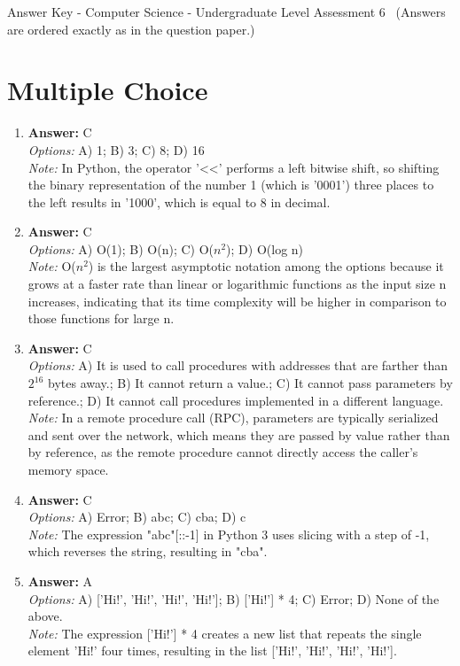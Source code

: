 \documentclass[12pt]{article}
\begin{document}
\begin{center}
Answer Key - Computer Science - Undergraduate Level Assessment 6 \
\small (Answers are ordered exactly as in the question paper.)
\end{center}

\section*{Multiple Choice}
\begin{enumerate}[label=\arabic*.]
\item \textbf{Answer:} C
\\ \textit{Options:} A) 1; B) 3; C) 8; D) 16
\\ \textit{Note:} In Python, the operator '\textless{}\textless{}' performs a left bitwise shift, so shifting the binary representation of the number 1 (which is '0001') three places to the left results in '1000', which is equal to 8 in decimal.
\item \textbf{Answer:} C
\\ \textit{Options:} A) O(1); B) O(n); C) O($n^2$); D) O(log n)
\\ \textit{Note:} O($n^2$) is the largest asymptotic notation among the options because it grows at a faster rate than linear or logarithmic functions as the input size n increases, indicating that its time complexity will be higher in comparison to those functions for large n.
\item \textbf{Answer:} C
\\ \textit{Options:} A) It is used to call procedures with addresses that are farther than $2^16$ bytes away.; B) It cannot return a value.; C) It cannot pass parameters by reference.; D) It cannot call procedures implemented in a different language.
\\ \textit{Note:} In a remote procedure call (RPC), parameters are typically serialized and sent over the network, which means they are passed by value rather than by reference, as the remote procedure cannot directly access the caller's memory space.
\item \textbf{Answer:} C
\\ \textit{Options:} A) Error; B) abc; C) cba; D) c
\\ \textit{Note:} The expression "abc"[::-1] in Python 3 uses slicing with a step of -1, which reverses the string, resulting in "cba".
\item \textbf{Answer:} A
\\ \textit{Options:} A) ['Hi!', 'Hi!', 'Hi!', 'Hi!']; B) ['Hi!'] * 4; C) Error; D) None of the above.
\\ \textit{Note:} The expression ['Hi!'] * 4 creates a new list that repeats the single element 'Hi!' four times, resulting in the list ['Hi!', 'Hi!', 'Hi!', 'Hi!'].
\end{enumerate}
\end{document}
